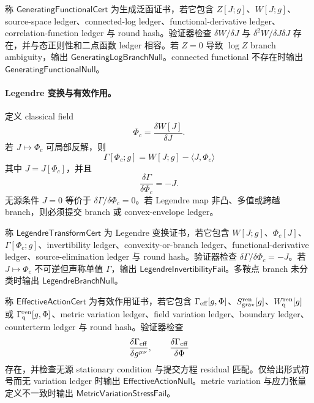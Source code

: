 \begin{definition}[生成泛函证书]\label{def:typed-address-biaxial-completion-generating-functional-cert}
称 \(\mathsf{GeneratingFunctionalCert}\) 为生成泛函证书，若它包含 \(Z[J;g]\)、\(W[J;g]\)、source-space ledger、connected-log ledger、functional-derivative ledger、correlation-function ledger 与 round hash。验证器检查 \(\delta W/\delta J\) 与 \(\delta^2W/\delta J\delta J\) 存在，并与态正则性和二点函数 ledger 相容。若 \(Z=0\) 导致 \(\log Z\) branch ambiguity，输出 \(\mathsf{GeneratingLogBranchNull}\)。connected functional 不存在时输出 \(\mathsf{GeneratingFunctionalNull}\)。
\end{definition}

\paragraph{Legendre 变换与有效作用。}
定义 classical field
\[
\Phi_c=\frac{\delta W[J]}{\delta J}.
\]
若 \(J\mapsto\Phi_c\) 可局部反解，则
\[
\boxed{
\Gamma[\Phi_c;g]
=
W[J;g]-\langle J,\Phi_c\rangle
}
\]
其中 \(J=J[\Phi_c]\)，并且
\[
\frac{\delta\Gamma}{\delta\Phi_c}=-J.
\]
无源条件 \(J=0\) 等价于 \(\delta\Gamma/\delta\Phi_c=0\)。若 Legendre map 非凸、多值或跨越 branch，则必须提交 branch 或 convex-envelope ledger。

\begin{definition}\label{def:typed-address-biaxial-completion-legendre-transform-cert}
称 \(\mathsf{LegendreTransformCert}\) 为 Legendre 变换证书，若它包含 \(W[J;g]\)、\(\Phi_c[J]\)、\(\Gamma[\Phi_c;g]\)、invertibility ledger、convexity-or-branch ledger、functional-derivative ledger、source-elimination ledger 与 round hash。验证器检查 \(\delta\Gamma/\delta\Phi_c=-J\)。若 \(J\mapsto\Phi_c\) 不可逆但声称单值 \(\Gamma\)，输出 \(\mathsf{LegendreInvertibilityFail}\)。多鞍点 branch 未分类时输出 \(\mathsf{LegendreBranchNull}\)。
\end{definition}

\begin{definition}[有效作用证书]\label{def:typed-address-biaxial-completion-effective-action-cert}
称 \(\mathsf{EffectiveActionCert}\) 为有效作用证书，若它包含 \(\Gamma_{\rm eff}[g,\Phi]\)、\(S_{\rm grav}^{\rm ren}[g]\)、\(W_{\rm q}^{\rm ren}[g]\) 或 \(\Gamma_{\rm q}^{\rm ren}[g,\Phi]\)、metric variation ledger、field variation ledger、boundary ledger、counterterm ledger 与 round hash。验证器检查
\[
\frac{\delta\Gamma_{\rm eff}}{\delta g^{\mu\nu}},
\qquad
\frac{\delta\Gamma_{\rm eff}}{\delta\Phi}
\]
存在，并检查无源 stationary condition 与提交方程 residual 匹配。仅给出形式符号而无 variation ledger 时输出 \(\mathsf{EffectiveActionNull}\)。metric variation 与应力张量定义不一致时输出 \(\mathsf{MetricVariationStressFail}\)。
\end{definition}


